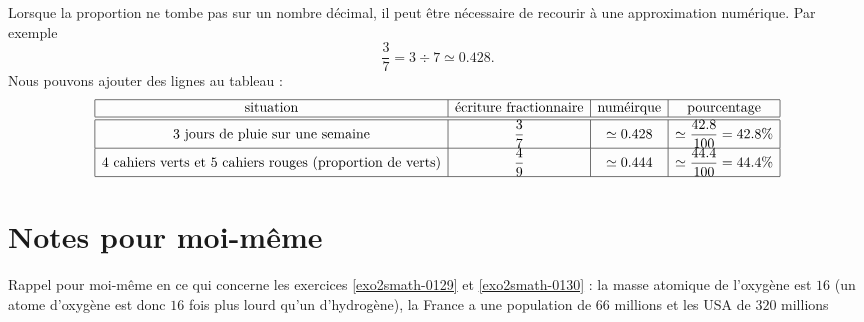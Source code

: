Lorsque la proportion ne tombe pas sur un nombre décimal, il peut être nécessaire de recourir à une approximation numérique. Par exemple 
\begin{equation}
    \frac{ 3 }{ 7 }=3\div 7\simeq 0.428.
\end{equation}
Nous pouvons ajouter des lignes au tableau :
\begin{equation*}
    \begin{array}[]{|c|c|c|c|}
        \hline
        \text{situation}&\text{écriture fractionnaire}&\text{numéirque}&\text{pourcentage}\\
        \hline\hline
        \text{\( 3\) jours de pluie sur une semaine}&\dfrac{ 3 }{ 7 }&  \simeq 0.428 &\simeq \dfrac{ 42.8 }{ 100 }=42.8\%\\
        \hline
        \text{\( 4\) cahiers verts et \( 5\) cahiers rouges (proportion de verts)}&\dfrac{ 4 }{ 9 }&  \simeq 0.444 &\simeq \dfrac{ 44.4 }{ 100 }=44.4\%\\
        \hline
    \end{array}
\end{equation*}

\section{Notes pour moi-même}

Rappel pour moi-même en ce qui concerne les exercices \ref{exo2smath-0129} et \ref{exo2smath-0130} : la masse atomique de l'oxygène est \( 16\) (un atome d'oxygène est donc \( 16\) fois plus lourd qu'un d'hydrogène), la France a une population de \( 66\) millions et les USA de \( 320\) millions

